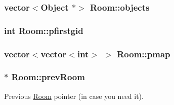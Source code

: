 \hypertarget{class_room_a6495b4a5cd0ea4979fcfbbb27c6b419e}{
\subsubsection[{objects}]{\setlength{\rightskip}{0pt plus 5cm}vector$<${\bf Object} $\ast$$>$ Room\-::objects\hspace{0.3cm}{\ttfamily [protected]}}}\label{class_room_a6495b4a5cd0ea4979fcfbbb27c6b419e}
\hypertarget{class_room_ac6125cd56db3bf38d2f44158159b3899}{
\subsubsection[{pfirstgid}]{\setlength{\rightskip}{0pt plus 5cm}int Room\-::pfirstgid\hspace{0.3cm}{\ttfamily [protected]}}}\label{class_room_ac6125cd56db3bf38d2f44158159b3899}
\hypertarget{class_room_a37b095fddfc6230033ed1de7afd9ec8d}{
\subsubsection[{pmap}]{\setlength{\rightskip}{0pt plus 5cm}vector$<$vector$<$int$>$ $>$ Room\-::pmap\hspace{0.3cm}{\ttfamily [protected]}}}\label{class_room_a37b095fddfc6230033ed1de7afd9ec8d}
\hypertarget{class_room_a18aec7a7911d1d4874267f1d7dcaf1a6}{
\subsubsection[{prev\-Room}]{$\ast$ Room\-::prev\-Room}}\label{class_room_a18aec7a7911d1d4874267f1d7dcaf1a6}


Previous \hyperlink{class_room}{Room} pointer (in case you need it). 

